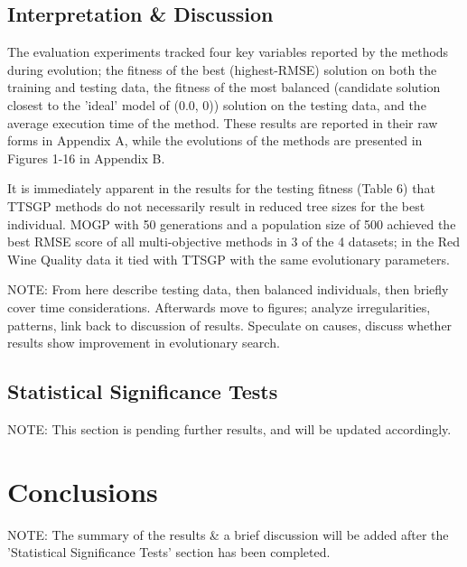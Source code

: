 \documentclass[a4paper, twocolumn]{article}
\begin{document}
\subsection{Interpretation \& Discussion}
The evaluation experiments tracked four key variables reported by the methods during evolution; the fitness of the best (highest-RMSE) solution on both the training and testing data, the fitness of the most balanced (candidate solution closest to the 'ideal' model of (0.0, 0)) solution on the testing data, and the average execution time of the method. These results are reported in their raw forms in Appendix A, while the evolutions of the methods are presented in Figures 1-16 in Appendix B.

It is immediately apparent in the results for the testing fitness (Table 6) that TTSGP methods do not necessarily result in reduced tree sizes for the best individual. MOGP with 50 generations and a population size of 500 achieved the best RMSE score of all multi-objective methods in 3 of the 4 datasets; in the Red Wine Quality data it tied with TTSGP with the same evolutionary parameters. 

NOTE: From here describe testing data, then balanced individuals, then briefly cover time considerations. Afterwards move to figures; analyze irregularities, patterns, link back to discussion of results. Speculate on causes, discuss whether results show improvement in evolutionary search.

\subsection{Statistical Significance Tests}
NOTE: This section is pending further results, and will be updated accordingly.

\section{Conclusions}
NOTE: The summary of the results \& a brief discussion will be added after the 'Statistical Significance Tests' section has been completed.
\end{document}
